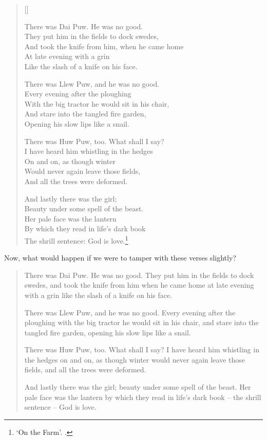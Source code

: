 \documentclass[0main.tex]{subfiles}
\begin{document}
\settowidth{\versewidth}{\footnotesize There was Dai Puw. He was no good.}
\begin{verse}[\versewidth]
{\footnotesize
There was Dai Puw. He was no good.\\
They put him in the fields to dock swedes,\\
And took the knife from him, when he came home\\
At late evening with a grin\\
Like the slash of a knife on his face.

There was Llew Puw, and he was no good.\\
Every evening after the ploughing\\
With the big tractor he would sit in his chair,\\
And stare into the tangled fire garden,\\
Opening his slow lips like a snail.

There was Huw Puw, too. What shall I say?\\
I have heard him whistling in the hedges\\
On and on, as though winter\\
Would never again leave those fields,\\
And all the trees were deformed.

And lastly there was the girl;\\
Beauty under some spell of the beast.\\
Her pale face was the lantern\\
By which they read in life's dark book\\
The shrill sentence: God is love.\footnote{`On the Farm'. \cite{norton}.}\\
}
\end{verse}

\bigskip

Now, what would happen if we were to tamper with these verses slightly?\\

\begin{verse}
{\footnotesize
There was Dai Puw. He was no good. They put him in the fields to dock swedes, and took the knife from him when he came home at late evening with a grin like the slash of a knife on his face.

There was Llew Puw, and he was no good. Every evening after the ploughing with the big tractor he would sit in his chair, and stare into the tangled fire garden, opening his slow lips like a snail.

There was Huw Puw, too. What shall I say? I have heard him whistling in the hedges on and on, as though winter would never again leave those fields, and all the trees were deformed.

And lastly there was the girl; beauty under some spell of the beast. Her pale face was the lantern by which they read in life's dark book -- the shrill sentence -- God is love.\\
}
\end{verse}
\end{document}
